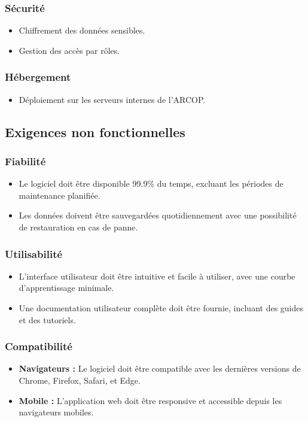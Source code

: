 \subsubsection{Sécurité}
\begin{itemize}
    \item Chiffrement des données sensibles.
    \item Gestion des accès par rôles.
\end{itemize}

\subsubsection{Hébergement}
\begin{itemize}
    \item Déploiement sur les serveurs internes de l'ARCOP.
\end{itemize}
\subsection{Exigences non fonctionnelles}


\subsubsection{Fiabilité}
\begin{itemize}
    \item Le logiciel doit être disponible 99.9\% du temps, excluant les périodes de maintenance planifiée.
    \item Les données doivent être sauvegardées quotidiennement avec une possibilité de restauration en cas de panne.
\end{itemize}

\subsubsection{Utilisabilité}
\begin{itemize}
    \item L'interface utilisateur doit être intuitive et facile à utiliser, avec une courbe d'apprentissage minimale.
    \item Une documentation utilisateur complète doit être fournie, incluant des guides et des tutoriels.
\end{itemize}

\subsubsection{Compatibilité}
\begin{itemize}
    \item \textbf{Navigateurs :} Le logiciel doit être compatible avec les dernières versions de Chrome, Firefox, Safari, et Edge.
    \item \textbf{Mobile :} L'application web doit être responsive et accessible depuis les navigateurs mobiles.
\end{itemize}

